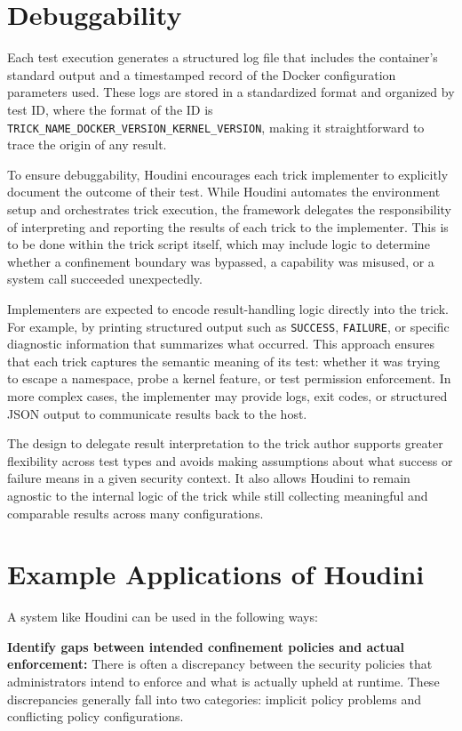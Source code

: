 \documentclass[12pt]{report}
\begin{document}
\begin{doublespace}
\section{Debuggability}

Each test execution generates a structured log file that includes the container's standard output and a timestamped record of the Docker configuration parameters used. These logs are stored in a standardized format and organized by test ID, where the format of the ID is \texttt{TRICK_NAME_DOCKER_VERSION_KERNEL_VERSION}, making it straightforward to trace the origin of any result.

To ensure debuggability, Houdini encourages each trick implementer to explicitly document the outcome of their test. While Houdini automates the environment setup and orchestrates trick execution, the framework delegates the responsibility of interpreting and reporting the results of each trick to the implementer. This is to be done within the trick script itself, which may include logic to determine whether a confinement boundary was bypassed, a capability was misused, or a system call succeeded unexpectedly.

Implementers are expected to encode result-handling logic directly into the trick. For example, by printing structured output such as \texttt{SUCCESS}, \texttt{FAILURE}, or specific diagnostic information that summarizes what occurred. This approach ensures that each trick captures the semantic meaning of its test: whether it was trying to escape a namespace, probe a kernel feature, or test permission enforcement. In more complex cases, the implementer may provide logs, exit codes, or structured JSON output to communicate results back to the host.

The design to delegate result interpretation to the trick author supports greater flexibility across test types and avoids making assumptions about what success or failure means in a given security context. It also allows Houdini to remain agnostic to the internal logic of the trick while still collecting meaningful and comparable results across many configurations. 

\section{Example Applications of Houdini}
A system like Houdini can be used in the following ways: 

\noindent\textbf{Identify gaps between intended confinement policies and actual enforcement:}
There is often a discrepancy between the security policies that administrators intend to enforce and what is actually upheld at runtime. These discrepancies generally fall into two categories: implicit policy problems and conflicting policy configurations.


\end{doublespace}
\end{document}
